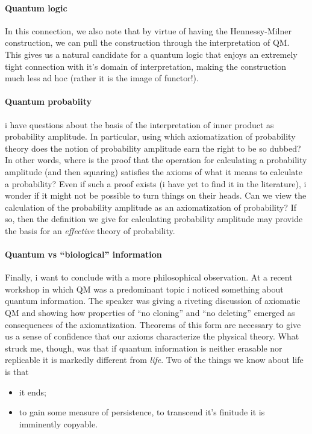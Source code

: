 \paragraph{Quantum logic}
In this connection, we also note that by virtue of having the
Hennessy-Milner construction, we can pull the construction through the
interpretation of QM. This gives us a natural candidate for a quantum
logic that enjoys an extremely tight connection with it's domain of
interpretation, making the construction much less ad hoc (rather it is
the image of functor!).

\paragraph{Quantum probabiity}
i have questions about the basis of the interpretation of inner
product as probability amplitude. In particular, using which
axiomatization of probability theory does the notion of probability
amplitude earn the right to be so dubbed? In other words, where is the
proof that the operation for calculating a probability amplitude (and
then squaring) satisfies the axioms of what it means to calculate a
probability? Even if such a proof exists (i have yet to find it in the
literature), i wonder if it might not be possible to turn things on
their heads. Can we view the calculation of the probability amplitude
as an axiomatization of probability? If so, then the definition we
give for calculating probability amplitude may provide the basis for
an \emph{effective} theory of probability.

\paragraph{Quantum vs ``biological'' information}
Finally, i want to conclude with a more philosophical observation. At
a recent workshop in which QM was a predominant topic i noticed
something about quantum information. The speaker was giving a riveting
discussion of axiomatic QM and showing how properties of ``no
cloning'' and ``no deleting'' emerged as consequences of the
axiomatization. Theorems of this form are necessary to give us a sense
of confidence that our axioms characterize the physical theory. What
struck me, though, was that if quantum information is neither erasable
nor replicable it is markedly different from \emph{life}. Two of the
things we know about life is that

\begin{itemize}
  \item it ends;
  \item to gain some measure of persistence, to transcend it's
    finitude it is imminently copyable.
\end{itemize}

